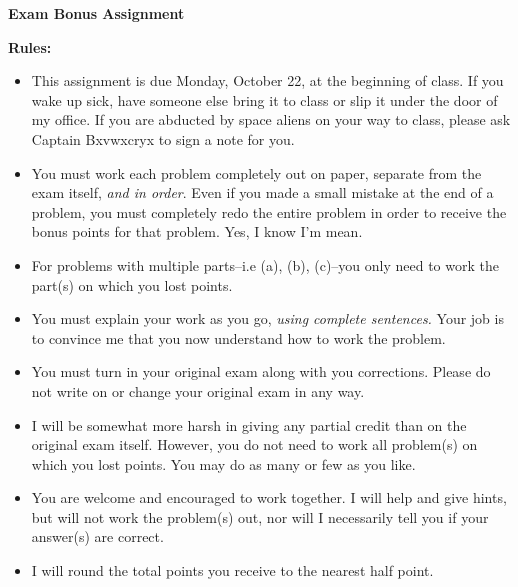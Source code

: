 \documentclass{article}
\begin{document}

\vspace{.15in}

{\centerline{\bf Exam Bonus Assignment}}

\vspace{.2in}



\vspace{0.25in}
\noindent\textbf{Rules:}
\begin{itemize}
\item  This assignment is due Monday, October 22, at the beginning of class.  If you wake up sick, have someone else bring it to class or slip it under the door of my office.  If you are abducted by space aliens on your way to class, please ask Captain Bxvwxcryx to sign a note for you.
\item  You must work each problem completely out on paper, separate from the exam itself, \emph{and in order}.    Even if you made a small mistake at the end of a problem, you must completely redo the entire problem in order to receive the bonus points for that problem.  Yes, I know I'm mean.
\item  For problems with multiple parts--i.e (a), (b), (c)--you only need to work the part(s) on which you lost points.
\item  You must explain your work as you go, \emph{using complete sentences.}  Your job is to convince me that you now understand how to work the problem.
\item  You must turn in your original exam along with you corrections.  Please do not write on or change your original exam in any way.
\item  I will be somewhat more harsh in giving any partial credit than on the original exam itself.  However, you do not need to work all problem(s) on which you lost points.  You may do as many or few as you like.
\item  You are welcome and encouraged to work together.  I will help and give hints, but will not work the problem(s) out, nor will I necessarily tell you if your answer(s) are correct.
\item  I will round the total points you receive to the nearest half point.

\end{itemize}
\end{document}
